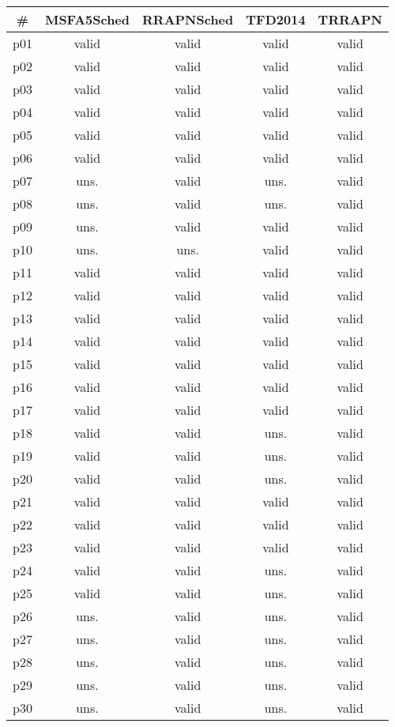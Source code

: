 \begin{tabular}{ccccc}
\toprule
\textbf{\#} & \textbf{MSFA5Sched} & \textbf{RRAPNSched} & \textbf{TFD2014} & \textbf{TRRAPN}\\
\midrule
p01 & valid & valid & valid & valid\\
p02 & valid & valid & valid & valid\\
p03 & valid & valid & valid & valid\\
p04 & valid & valid & valid & valid\\
p05 & valid & valid & valid & valid\\
p06 & valid & valid & valid & valid\\
p07 & uns. & valid & uns. & valid\\
p08 & uns. & valid & uns. & valid\\
p09 & uns. & valid & valid & valid\\
p10 & uns. & uns. & valid & valid\\
p11 & valid & valid & valid & valid\\
p12 & valid & valid & valid & valid\\
p13 & valid & valid & valid & valid\\
p14 & valid & valid & valid & valid\\
p15 & valid & valid & valid & valid\\
p16 & valid & valid & valid & valid\\
p17 & valid & valid & valid & valid\\
p18 & valid & valid & uns. & valid\\
p19 & valid & valid & uns. & valid\\
p20 & valid & valid & uns. & valid\\
p21 & valid & valid & valid & valid\\
p22 & valid & valid & valid & valid\\
p23 & valid & valid & valid & valid\\
p24 & valid & valid & uns. & valid\\
p25 & valid & valid & uns. & valid\\
p26 & uns. & valid & uns. & valid\\
p27 & uns. & valid & uns. & valid\\
p28 & uns. & valid & uns. & valid\\
p29 & uns. & valid & uns. & valid\\
p30 & uns. & valid & uns. & valid\\
\bottomrule
\end{tabular}

